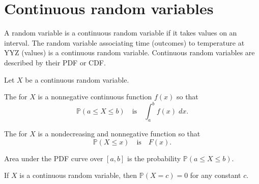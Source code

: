 \documentclass[../main.tex]{subfiles}
\begin{document}
 \section{Continuous random variables}

A random variable is a continuous random variable if it takes values on an interval. The random variable associating time (outcomes) to temperature at YYZ (values) is a continuous random variable. Continuous random variables are described by their PDF or CDF.

\begin{definition} \label{def:pdf-cdf}
  Let \(X\) be a continuous random variable.

  The  for \(X\) is a nonnegative continuous function \(f(x)\) so that
  \[
    \mathbb{P}(a \le X \le b)
    \quad\text{is}\quad
    \int_{a}^{b} f(x) \;dx.
  \]

  The  for \(X\) is a nondecreasing and nonnegative function so that
  \[
    \mathbb{P}(X \le x)
    \quad\text{is}\quad
    F(x).
  \]

\end{definition}

\faStar{} Area under the PDF   curve over \([a,b]\) is the probability \(\mathbb{P}(a \le X \le b)\).

\begin{center}
  \quad
\end{center}
\faExclamationTriangle{} If \(X\) is a continuous random variable, then \(\mathbb{P}(X = c) = 0\) for any constant \(c\).
\end{document}
